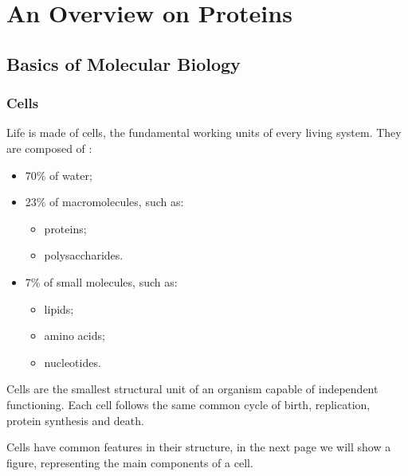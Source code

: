 \chapter{An Overview on Proteins}
\label{chp:proteins}

\section{Basics of Molecular Biology}
\subsection{Cells}
Life is made of cells, the fundamental working units of every living system. They are composed of :
\begin{itemize}
	\item 70\% of water;
	\item 23\% of macromolecules, such as:
	\begin{itemize}
		\item proteins;
		\item polysaccharides.
	\end{itemize}
	
	\item 7\% of small molecules, such as:
	\begin{itemize}
		\item lipids;
		\item amino acids;
		\item nucleotides.
	\end{itemize}
\end{itemize}
Cells are the smallest structural unit of an organism capable of independent functioning. Each cell follows the same common cycle of birth, replication, protein synthesis and death. 

Cells have common features in their structure, in the next page we will show a figure, representing the main components of a cell.

\pagebreak


